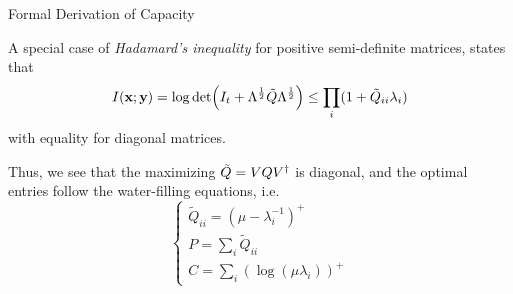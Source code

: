 \begin{frame}[allowframebreaks]{Formal Derivation of Capacity}
\framebreak

A special case of \textit{Hadamard's inequality} for positive semi-definite matrices, states that
$$I(\vb{x;y})
= \log\det(I_t + \Lambda^\frac{1}{2}\tilde{Q}\Lambda^\frac{1}{2})
\leq \prod_i (1+ \tilde{Q}_{ii}\lambda_i) $$
with equality for diagonal matrices.

Thus, we see that the maximizing $\tilde{Q} = VQV^\dagger$ is diagonal, and the optimal entries follow the water-filling equations, i.e.
\begin{equation*}
\begin{cases}
\tilde{Q}_{ii} = (\mu-\lambda_i^{-1})^+\\
P = \sum_i \tilde{Q}_{ii}\\
C = \sum_i (\log(\mu\lambda_i))^+
\end{cases}
\end{equation*}

\end{frame}